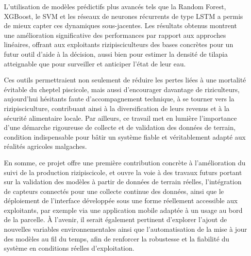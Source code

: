 \documentclass[a4paper,12pt, oneside]{article}
\begin{document}
L'utilisation de modèles prédictifs plus avancés tels que la Random Forest, XGBoost, le SVM et les réseaux de neurones récurrents de type LSTM a permis de mieux capter ces dynamiques sous-jacentes. Les résultats obtenus montrent une amélioration significative des performances par rapport aux approches linéaires, offrant aux exploitants rizipisciculteurs des bases concrètes pour un futur outil d'aide à la décision, aussi bien pour estimer la densité de tilapia atteignable que pour surveiller et anticiper l'état de leur eau.

Ces outils permettraient non seulement de réduire les pertes liées à une mortalité évitable du cheptel piscicole, mais aussi d'encourager davantage de riziculteurs, aujourd'hui hésitants faute d'accompagnement technique, à se tourner vers la rizipisciculture, contribuant ainsi à la diversification de leurs revenus et à la sécurité alimentaire locale. Par ailleurs, ce travail met en lumière l'importance d'une démarche rigoureuse de collecte et de validation des données de terrain, condition indispensable pour bâtir un système fiable et véritablement adapté aux réalités agricoles malgaches.

En somme, ce projet offre une première contribution concrète à l'amélioration du suivi de la production rizipiscicole, et ouvre la voie à des travaux futurs portant sur la validation des modèles à partir de données de terrain réelles, l'intégration de capteurs connectés pour une collecte continue des données, ainsi que le déploiement de l'interface développée sous une forme réellement accessible aux exploitants, par exemple via une application mobile adaptée à un usage au bord de la parcelle. À l'avenir, il serait également pertinent d'explorer l'ajout de nouvelles variables environnementales ainsi que l'automatisation de la mise à jour des modèles au fil du temps, afin de renforcer la robustesse et la fiabilité du système en conditions réelles d'exploitation.

\vspace*{\fill}
\newpage
\end{document}
